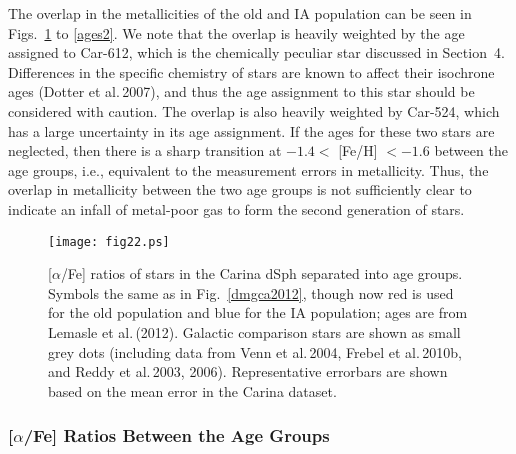 \documentclass{emulateapj}
\newcommand\etal{{\rm et al.\,}}
\begin{document}
The overlap in the metallicities of the old and IA population can be seen
in Figs.~\ref{ages1} to \ref{ages2}.    We note that the overlap 
is heavily weighted by the age assigned to Car-612, which is the chemically 
peculiar star discussed in Section~4.  Differences in the specific chemistry 
of stars are known to affect their isochrone ages (Dotter \etal 2007), 
and thus the age assignment to this star should be considered with caution.
The overlap is also heavily weighted by Car-524, which has a large 
uncertainty in its age assignment.  If the ages for these two stars are neglected, 
then there is a sharp transition at $-1.4 <$ [Fe/H] $< -1.6$ between
the age groups, i.e., equivalent to the measurement errors in metallicity.  
Thus, the overlap in metallicity between the two age groups is not sufficiently 
clear to indicate an infall of metal-poor gas to form the second generation of stars. 


\begin{figure}[t]
\begin{center}
\texttt{[image: fig22.ps]}
\caption{[$\alpha$/Fe] ratios of stars in the Carina dSph
separated into age groups.  
 Symbols the same as in Fig.~\ref{dmgca2012}, 
though now red is used for the old population 
and blue for the IA population; 
ages are from Lemasle \etal (2012).
Galactic comparison stars are shown as small grey dots (including
data from Venn \etal 2004, Frebel \etal 2010b, and
Reddy \etal 2003, 2006).   Representative errorbars are shown
based on the mean error in the Carina dataset.
}
\label{ages1}
\end{center}
\end{figure}


\subsubsection{[$\alpha$/Fe] Ratios Between the Age Groups}
\end{document}
